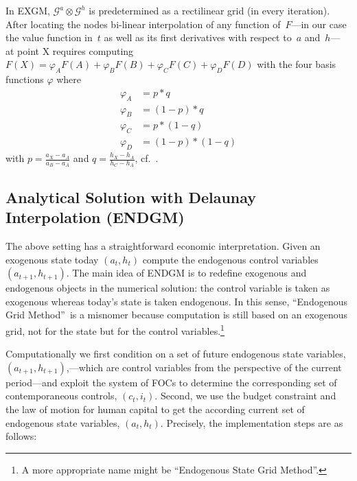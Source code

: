 \documentclass[a4paper,12pt]{article}
\begin{document}
In EXGM, $\mathcal{G}^{a}\otimes\mathcal{G}^{h}$ is predetermined as a rectilinear grid (in every iteration). After locating the nodes bi-linear interpolation of any function of~$F$---in our case the value function in~$t$ as well as its first derivatives with respect to~$a$ and~$h$--- at point X requires computing $F\left(  X\right)  =\varphi_{A}F(A)+\varphi_{B}F(B)+\varphi_{C}F(C)+\varphi_{D}F(D)$ with the four basis functions $\varphi$ where
\begin{align*}
	\varphi_{A}  &  = p \ast q  \\
	\varphi_{B}  &  = \left(1 - p\right) \ast q  \\
	\varphi_{C}  &  = p \ast \left(1 - q\right)  \\
	\varphi_{D}  &  = \left(1 - p\right) \ast \left(1 - q\right)
\end{align*}
with $p = \frac{a_{X} - a_{A}} {a_{B} - a_{A}}$ and $q = \frac{h_{X} - h_{A}} {h_{C} - h_{A}}$, cf.~.

\subsection{Analytical Solution with Delaunay Interpolation \newline(ENDGM)}

\label{ss:analendgm}

The above setting has a straightforward economic interpretation. Given an exogenous state today $\left(a_{t},h_{t}\right)$ compute the endogenous control variables $\left(a_{t+1},h_{t+1}\right)$. The main idea of ENDGM is to redefine exogenous and endogenous objects in the numerical solution: the control variable is taken as exogenous whereas today's state is taken endogenous. In this sense, \textquotedblleft Endogenous Grid Method\textquotedblright\ is a misnomer because computation is still based on an exogenous grid, not for the state but for the control variables.\footnote{A more appropriate name might be \textquotedblleft Endogenous State Grid Method\textquotedblright.}

Computationally we first condition on a set of future endogenous state variables, $\left(a_{t+1},h_{t+1}\right)$,---which are control variables from the perspective of the current period---and exploit the system of FOCs to determine the corresponding set of contemporaneous controls, $\left(c_{t},i_{t}\right)$. Second, we use the budget constraint and the law of motion for human capital to get the according current set of endogenous state variables, $\left(a_{t},h_{t}\right)$. Precisely, the implementation steps are as follows:
\end{document}
